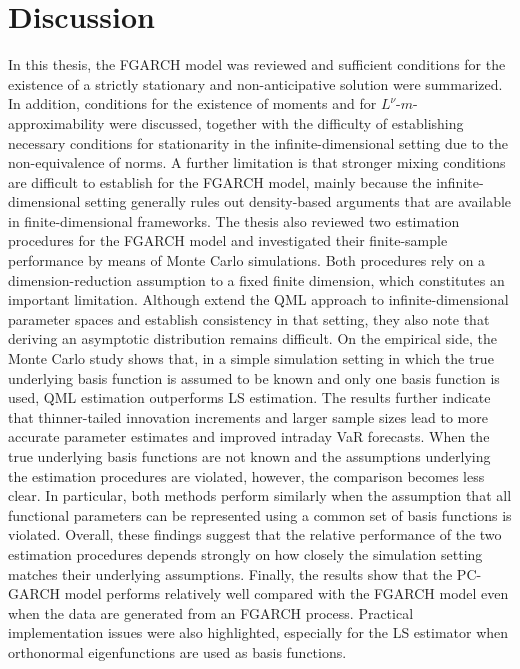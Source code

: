 \documentclass[12pt,a4paper]{article}
\theoremstyle{definition}
\begin{document}
\section{Discussion}
\label{sec:Discussion}
In this thesis, the FGARCH model was reviewed and sufficient conditions for the existence of a strictly stationary and non-anticipative solution were summarized. In addition, conditions for the existence of moments and for $L^\nu$-$m$-approximability were discussed, together with the difficulty of establishing necessary conditions for stationarity in the infinite-dimensional setting due to the non-equivalence of norms. A further limitation is that stronger mixing conditions are difficult to establish for the FGARCH model, mainly because the infinite-dimensional setting generally rules out density-based arguments that are available in finite-dimensional frameworks. The thesis also reviewed two estimation procedures for the FGARCH model and investigated their finite-sample performance by means of Monte Carlo simulations. Both procedures rely on a dimension-reduction assumption to a fixed finite dimension, which constitutes an important limitation. Although \citeauthor{Cerovecki2019} extend the QML approach to infinite-dimensional parameter spaces and establish consistency in that setting, they also note that deriving an asymptotic distribution remains difficult. On the empirical side, the Monte Carlo study shows that, in a simple simulation setting in which the true underlying basis function is assumed to be known and only one basis function is used, QML estimation outperforms LS estimation. The results further indicate that thinner-tailed innovation increments and larger sample sizes lead to more accurate parameter estimates and improved intraday VaR forecasts. When the true underlying basis functions are not known and the assumptions underlying the estimation procedures are violated, however, the comparison becomes less clear. In particular, both methods perform similarly when the assumption that all functional parameters can be represented using a common set of basis functions is violated. Overall, these findings suggest that the relative performance of the two estimation procedures depends strongly on how closely the simulation setting matches their underlying assumptions. Finally, the results show that the PC-GARCH model performs relatively well compared with the FGARCH model even when the data are generated from an FGARCH process. Practical implementation issues were also highlighted, especially for the LS estimator when orthonormal eigenfunctions are used as basis functions.
\end{document}
